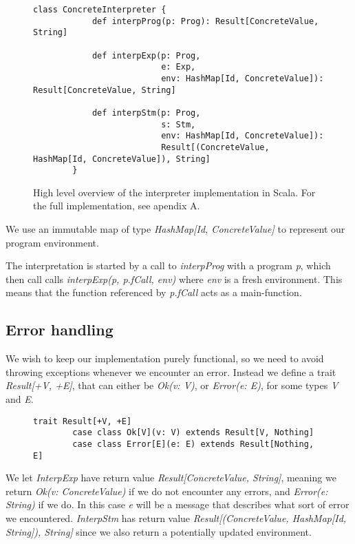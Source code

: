 \begin{figure}[!h]
	\begin{lstlisting}[style=complex]
		class ConcreteInterpreter {
			def interpProg(p: Prog): Result[ConcreteValue, String]
			
			def interpExp(p: Prog,
						  e: Exp, 
						  env: HashMap[Id, ConcreteValue]): Result[ConcreteValue, String]
						  
			def interpStm(p: Prog,
						  s: Stm,
						  env: HashMap[Id, ConcreteValue]):
						  Result[(ConcreteValue, HashMap[Id, ConcreteValue]), String]
		}
	\end{lstlisting}
	\caption{High level overview of the interpreter implementation in Scala. For the full implementation, see apendix A.}
\end{figure}
\newpage
We use an immutable map of type \textsl{HashMap[Id, ConcreteValue]} to represent our program environment.

The interpretation is started by a call to \textsl{interpProg} with a program \textsl{p}, which then call calls \textsl{interpExp(p, p.fCall, env)} where \textsl{env} is a fresh environment. This means that the function referenced by \textsl{p.fCall} acts as a main-function. 

\subsection{Error handling}
We wish to keep our implementation purely functional, so we need to avoid throwing exceptions whenever we encounter an error. Instead we define a trait \textsl{Result[+V, +E]}, that can either be \textsl{Ok(v: V)},  or \textsl{Error(e: E)}, for some types \textsl{V} and \textsl{E}.

\begin{figure}[!h]
	\begin{lstlisting}[style=complex]
		trait Result[+V, +E]
		case class Ok[V](v: V) extends Result[V, Nothing]
		case class Error[E](e: E) extends Result[Nothing, E]
	\end{lstlisting}
\end{figure}

We let \textsl{InterpExp} have return value \textsl{Result[ConcreteValue, String]}, meaning we return \textsl{Ok(v: ConcreteValue)} if we do not encounter any errors, and \textsl{Error(e: String)} if we do. In this case \textsl{e} will be a message that describes what sort of error we encountered. \textsl{InterpStm} has return value 
 \textsl{Result[(ConcreteValue, HashMap[Id, String]), String]} since we also return a potentially updated environment. 


